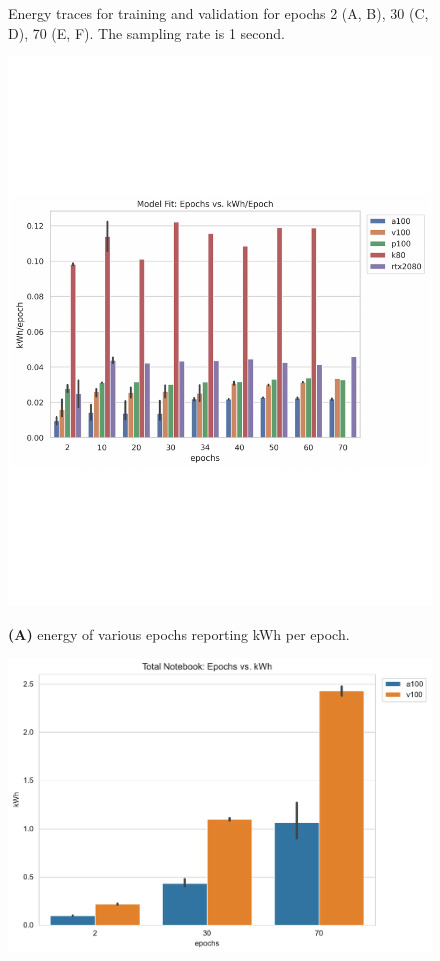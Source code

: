 \documentclass[utf8]{FrontiersinVancouver} %
\begin{document}
{\begin{figure}[htb]
     \caption{Energy traces for training and validation for epochs 2 (A, B), 30 (C, D), 70 (E, F). The sampling rate is 1 second.}
     \label{fig:energy-graphs}
\end{figure}



\begin{figure}[htb]

  \begin{center}

       \includegraphics[height=0.29\textheight]{images/energy_all_model_fit_kWh_per_epoch.pdf}

       {\bf (A)} energy of various epochs reporting kWh per epoch.
          
        \includegraphics[height=0.29\textheight]{images/total_epoch_vs_watts.pdf}


\end{center}
\end{figure}}
\end{document}
